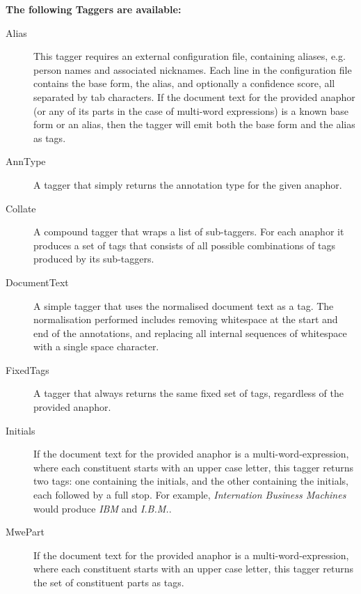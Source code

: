 \textbf{The following Taggers are available:}
\begin{description}
\item[Alias] This tagger requires an external configuration file, containing
  aliases, e.g. person names and associated nicknames. Each line in the
  configuration file contains the base form, the alias, and optionally a
  confidence score, all separated by tab characters. If the document text for
  the provided anaphor (or any of its parts in the case of multi-word
  expressions) is a known base form or an alias, then the tagger will emit
  both the base form and the alias as tags.
\item[AnnType] A tagger that simply returns the annotation type for the given
  anaphor.
\item[Collate] A compound tagger that wraps a list of sub-taggers. For each
  anaphor it produces a set of tags that consists of all possible combinations
  of tags produced by its sub-taggers.
\item[DocumentText] A simple tagger that uses the normalised document text as a
  tag. The normalisation performed includes removing whitespace at the start and
  end of the annotations, and replacing all internal sequences of whitespace
  with a single space character.
\item[FixedTags] A tagger that always returns the same fixed set of tags,
 regardless of the provided anaphor. 
\item[Initials] If the document text for the provided anaphor is a
  multi-word-expression, where each constituent starts with an upper case
  letter, this tagger returns two tags: one containing the initials, and the
  other containing the initials, each followed by a full stop. For example,
  {\em Internation Business Machines} would produce {\em IBM} and {\em I.B.M.}.
\item[MwePart] If the document text for the provided anaphor is a
  multi-word-expression, where each constituent starts with an upper case
  letter, this tagger returns the set of constituent parts as tags. 
\end{description}

